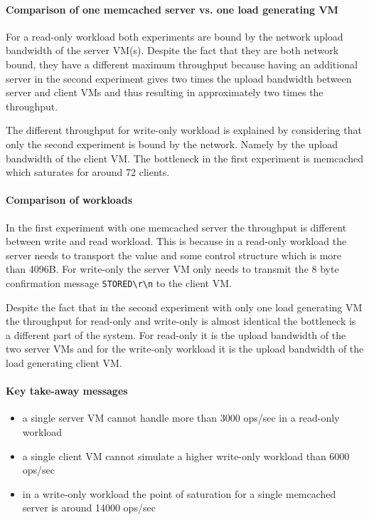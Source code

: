 \documentclass[report.tex]{subfiles}
\begin{document}
\paragraph{Comparison of one memcached server vs. one load generating VM}
For a read-only workload both experiments are bound by the network upload bandwidth of the server VM(s).
Despite the fact that they are both network bound, they have a different maximum throughput because having an additional server in the second experiment gives two times the upload bandwidth between server and client VMs and thus resulting in approximately two times the throughput.

The different throughput for write-only workload is explained by considering that only the second experiment is bound by the network. Namely by the upload bandwidth of the client VM. The bottleneck in the first experiment is memcached which saturates for around 72 clients.

\paragraph{Comparison of workloads}
In the first experiment with one memcached server the throughput is different between write and read workload. This is because in a read-only workload the server needs to transport the value and some control structure which is more than 4096B. For write-only the server VM only needs to transmit the 8 byte confirmation message \texttt{STORED\textbackslash r\textbackslash n} to the client VM. 

Despite the fact that in the second experiment with only one load generating VM the throughput for read-only and write-only is almost identical the bottleneck is a different part of the system. For read-only it is the upload bandwidth of the two server VMs and for the write-only workload it is the upload bandwidth of the load generating client VM.

\paragraph{Key take-away messages}
\begin{itemize}
	\item a single server VM cannot handle more than 3000 ops/sec in a read-only workload
	\item a single client VM cannot simulate a higher write-only workload than 6000 ops/sec
	\item in a write-only workload the point of saturation for a single memcached server is around 14000 ops/sec
\end{itemize}
\end{document}
